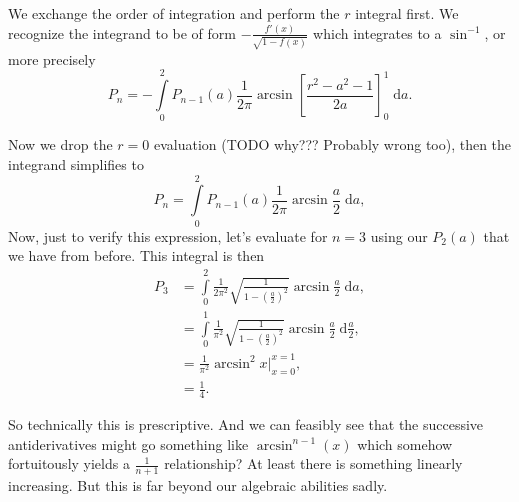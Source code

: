 \documentclass[12pt]{report}
\begin{document}
We exchange the order of integration and perform the $r$ integral first. We
recognize the integrand to be of form $-\frac{f'(x)}{\sqrt{1 - f(x)}}$ which
integrates to a $\sin^{-1}$, or more precisely
\begin{equation}
    P_n = -\int\limits_{0}^{2}P_{n - 1}(a)
        \frac{1}{2\pi} \arcsin \left[
            \frac{r^2 - a^2 - 1}{2a}
        \right]_0^1\;\mathrm{d}a.
\end{equation}

Now we drop the $r = 0$ evaluation (TODO why??? Probably wrong too), then the
integrand simplifies to
\begin{equation}
    P_n = \int\limits_{0}^{2}P_{n - 1}(a)
        \frac{1}{2\pi} \arcsin \frac{a}{2}\;\mathrm{d}a,
\end{equation}
Now, just to verify this expression, let's evaluate for $n = 3$ using our
$P_2(a)$ that we have from before. This integral is then
\begin{align}
    P_3 &= \int\limits_{0}^{2}\frac{1}{2\pi^2}
        \sqrt{\frac{1}{1 - \left( \frac{a}{2} \right)^2}}
        \arcsin \frac{a}{2}\;\mathrm{d}a,\nonumber\\
        &= \int\limits_{0}^{1}\frac{1}{\pi^2}
            \sqrt{\frac{1}{1 - \left( \frac{a}{2} \right)^2}}
            \arcsin \frac{a}{2}\;\mathrm{d}\frac{a}{2},\nonumber\\
        &= \frac{1}{\pi^2} \arcsin^2 x\Bigg|_{x=0}^{x=1},\nonumber\\
        &= \frac{1}{4}.
\end{align}

So technically this is prescriptive. And we can feasibly see that the successive
antiderivatives might go something like $\arcsin^{n-1}(x)$ which somehow
fortuitously yields a $\frac{1}{n + 1}$ relationship? At least there is
something linearly increasing. But this is far beyond our algebraic abilities
sadly.
\end{document}
